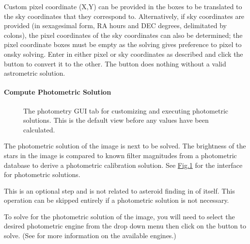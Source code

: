 \documentclass[letterpaper,11pt,english]{sphinxmanual}
\begin{document}
\sphinxAtStartPar
Custom pixel coordinate (X,Y) can be provided in the boxes to be translated to
the sky coordinates that they correspond to. Alternatively, if sky coordinates
are provided (in sexagesimal form, RA hours and DEC degrees, delimitated by
colons), the pixel coordinates of the sky coordinates can also be determined;
the pixel coordinate boxes must be empty as the solving gives preference to
pixel to on\sphinxhyphen{}sky solving. Enter in either pixel or sky coordinates as described
and click the  button to convert it to the other. The
button does nothing without a valid astrometric solution.


\paragraph{Compute Photometric Solution}
\label{\detokenize{user/manual_mode:compute-photometric-solution}}\label{\detokenize{user/manual_mode:user-manual-mode-procedure-find-asteroid-location-compute-photometric-solution}}
\begin{figure}[H]
\centering
\capstart

\noindent{}
\caption{The photometry GUI tab for customizing and executing photometric solutions.
This is the default view before any values have been calculated.}\label{\detokenize{user/manual_mode:id6}}\label{\detokenize{user/manual_mode:figure-manual-mode-gui-photometry}}\end{figure}

\sphinxAtStartPar
The photometric solution of the image is next to be solved. The brightness of
the stars in the image is compared to known filter magnitudes from a
photometric database to derive a photometric calibration solution.
See \hyperref[\detokenize{user/manual_mode:figure-manual-mode-gui-photometry}]{Fig.\@ \ref{\detokenize{user/manual_mode:figure-manual-mode-gui-photometry}}} for the interface for
photometric solutions.

\sphinxAtStartPar
This is an optional step and is not related to asteroid finding in of itself.
This operation can be skipped entirely if a photometric solution is not
necessary.

\sphinxAtStartPar
To solve for the photometric solution of the image, you will need to select
the desired photometric engine from the drop down menu then click on the
 button to solve.
(See {\hyperref[\detokenize{technical/architecture/services_engines:technical-architecture-services-engines}]{}} for more information on
the available engines.)
\end{document}
